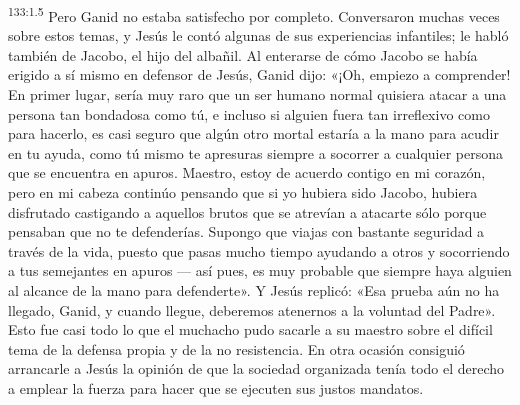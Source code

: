 \par
\textsuperscript{133:1.5} Pero Ganid no estaba satisfecho por completo. Conversaron muchas veces sobre estos temas, y Jesús le contó algunas de sus experiencias infantiles; le habló también de Jacobo, el hijo del albañil. Al enterarse de cómo Jacobo se había erigido a sí mismo en defensor de Jesús, Ganid dijo: «¡Oh, empiezo a comprender! En primer lugar, sería muy raro que un ser humano normal quisiera atacar a una persona tan bondadosa como tú, e incluso si alguien fuera tan irreflexivo como para hacerlo, es casi seguro que algún otro mortal estaría a la mano para acudir en tu ayuda, como tú mismo te apresuras siempre a socorrer a cualquier persona que se encuentra en apuros. Maestro, estoy de acuerdo contigo en mi corazón, pero en mi cabeza continúo pensando que si yo hubiera sido Jacobo, hubiera disfrutado castigando a aquellos brutos que se atrevían a atacarte sólo porque pensaban que no te defenderías. Supongo que viajas con bastante seguridad a través de la vida, puesto que pasas mucho tiempo ayudando a otros y socorriendo a tus semejantes en apuros --- así pues, es muy probable que siempre haya alguien al alcance de la mano para defenderte». Y Jesús replicó: «Esa prueba aún no ha llegado, Ganid, y cuando llegue, deberemos atenernos a la voluntad del Padre». Esto fue casi todo lo que el muchacho pudo sacarle a su maestro sobre el difícil tema de la defensa propia y de la no resistencia. En otra ocasión consiguió arrancarle a Jesús la opinión de que la sociedad organizada tenía todo el derecho a emplear la fuerza para hacer que se ejecuten sus justos mandatos.

